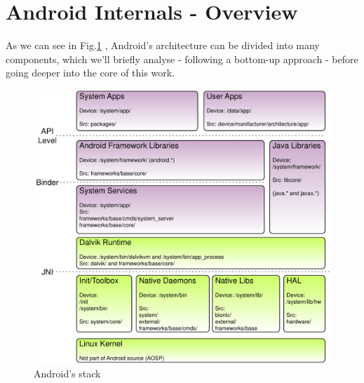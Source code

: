 \section{Android Internals - Overview}
\label{overview}
As we can see in Fig.\ref{fig:stack} \cite{remixingand}, Android's architecture can be divided into many components, which we'll briefly analyse - following a bottom-up approach - before going deeper into the core of this work.
\begin{figure}[!htb]
	\centering
	\includegraphics[scale=.6]{images/stack.pdf}
	\caption{Android's stack}
	\label{fig:stack}
\end{figure}
